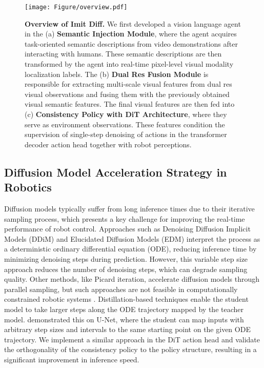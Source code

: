 \begin{figure*}[htbp]
    \centering
    \texttt{[image: Figure/overview.pdf]} 
    \caption{\textbf{Overview of Imit Diff.} We first developed a vision language agent in the (a) \textbf{Semantic Injection Module}, where the agent acquires task-oriented semantic descriptions from video demonstrations after interacting with humans. These semantic descriptions are then transformed by the agent into real-time pixel-level visual modality localization labels. The (b) \textbf{Dual Res Fusion Module} is responsible for extracting multi-scale visual features from dual res visual observations and fusing them with the previously obtained visual semantic features. The final visual features are then fed into (c) \textbf{Consistency Policy with DiT Architecture}, where they serve as environment observations. These features condition the supervision of single-step denoising of actions in the transformer decoder action head together with robot perceptions.}
    \label{fig:overview}
\end{figure*}

\subsection{Diffusion Model Acceleration Strategy in Robotics}
Diffusion models typically suffer from long inference times due to their iterative sampling process, which presents a key challenge for improving the real-time performance of robot control. Approaches such as Denoising Diffusion Implicit Models (DDiM) \citep{song2020denoising} and Elucidated Diffusion Models (EDM) \citep{ning2023elucidating} interpret the process as a deterministic ordinary differential equation (ODE), reducing inference time by minimizing denoising steps during prediction. However, this variable step size approach reduces the number of denoising steps, which can degrade sampling quality. Other methods, like Picard iteration, accelerate diffusion models through parallel sampling, but such approaches are not feasible in computationally constrained robotic systems \citep{shih2024parallel}. Distillation-based techniques enable the student model to take larger steps along the ODE trajectory mapped by the teacher model. \citet{prasad2024consistency} demonstrated this on U-Net, where the student can map inputs with arbitrary step sizes and intervals to the same starting point on the given ODE trajectory. We implement a similar approach in the DiT action head and validate the orthogonality of the consistency policy to the policy structure, resulting in a significant improvement in inference speed.

